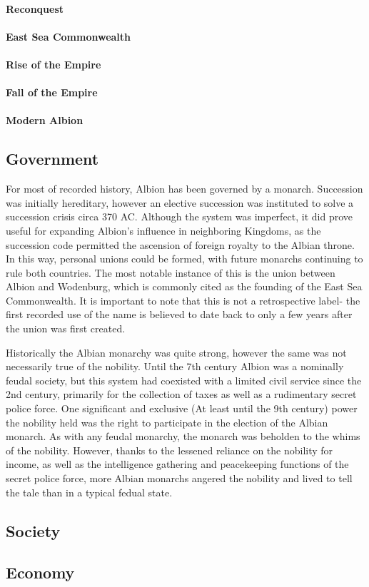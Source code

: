 	\paragraph{Reconquest}

	\paragraph{East Sea Commonwealth}

	\paragraph{Rise of the Empire}

	\paragraph{Fall of the Empire}

	\paragraph{Modern Albion}


\subsection{Government}
	
	For most of recorded history, Albion has been governed by a monarch.  Succession was initially hereditary, however an elective succession was instituted to solve a succession crisis circa 370 AC.  Although the system was imperfect, it did prove useful for expanding Albion's influence in neighboring Kingdoms, as the succession code permitted the ascension of foreign royalty to the Albian throne.  In this way, personal unions could be formed, with future monarchs continuing to rule both countries.  The most notable instance of this is the union between Albion and Wodenburg, which is commonly cited as the founding of the East Sea Commonwealth.  It is important to note that this is not a retrospective label- the first recorded use of the name is believed to date back to only a few years after the union was first created.
	
	Historically the Albian monarchy was quite strong, however the same was not necessarily true of the nobility.  Until the 7th century Albion was a nominally feudal society, but this system had  coexisted with a limited civil service since the 2nd century, primarily for the collection of taxes as well as a rudimentary secret police force.  One significant and exclusive (At least until the 9th century) power the nobility held was the right to participate in the election of the Albian monarch.  As with any feudal monarchy, the monarch was beholden to the whims of the nobility.  However, thanks to the lessened reliance on the nobility for income, as well as the intelligence gathering and peacekeeping functions of the secret police force, more Albian monarchs angered the nobility and lived to tell the tale than in a typical fedual state.

\subsection{Society}

\subsection{Economy}